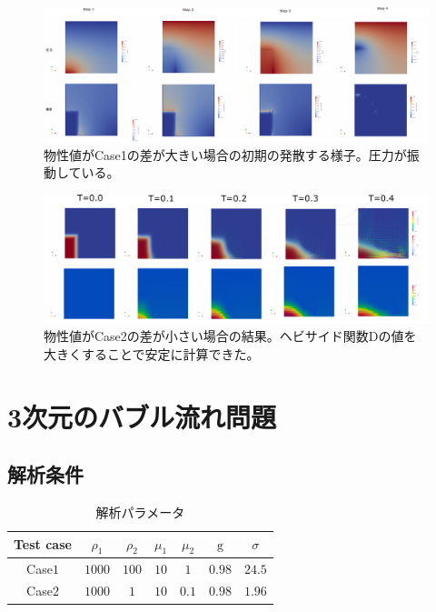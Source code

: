 \documentclass[8pt,a4paper]{article}
\begin{document}
\begin{figure}[htbp]
	\centering
	\includegraphics[width=18truecm]{pics/3d-dambreak/diverge_water_air.pdf}
	\caption{物性値がCase1の差が大きい場合の初期の発散する様子。圧力が振動している。}
	\label{fig:3d-dambreak-diverge}
\end{figure}

\begin{figure}[htbp]
	\centering
	\includegraphics[width=18truecm]{pics/3d-dambreak/levelset_velocity.pdf}
	\caption{物性値がCase2の差が小さい場合の結果。ヘビサイド関数Dの値を大きくすることで安定に計算できた。}
	\label{fig:3d-dambreak-diverge}
\end{figure}

\newpage
\section{3次元のバブル流れ問題}
\subsection{解析条件}

\renewcommand{\arraystretch}{1}
\begin{table}[H]
	\centering
	\caption{解析パラメータ}
	\begin{tabular}{ccccccc}
		\hline
		Test case & $\rho_1$ & $\rho_2$ & $\mu_1$ & $\mu_2$ & $\mathrm{g}$ & $\sigma$\\
		\hline 
		Case$1$ & $1000$ & $100$ & $10$ & $1$   & $0.98$ & $24.5$ \\
		Case$2$ & $1000$ & $1$   & $10$ & $0.1$ & $0.98$ & $1.96$ \\
		\hline         
	\end{tabular}
	\label{table:mars-env}
\end{table}
\renewcommand{\arraystretch}{1.0}
\end{document}
